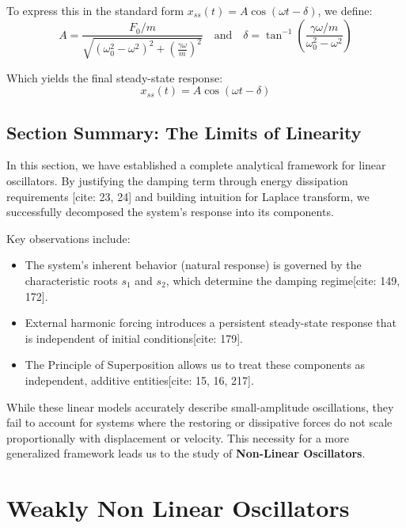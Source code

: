 \documentclass[10pt,twoside]{report}
\begin{document}
To express this in the standard form $x_{ss}(t) = A \cos(\omega t - \delta)$, we define:
\begin{equation}
\label{Amp and phase response for FDO}
    A = \frac{F_0/m}{\sqrt{(\omega_0^2 - \omega^2)^2 + \left(\frac{\gamma \omega}{m}\right)^2}} \quad \text{and} \quad \delta = \tan^{-1}\left( \frac{\gamma \omega/m}{\omega_0^2 - \omega^2} \right)
\end{equation}

Which yields the final steady-state response:
\begin{equation}
    \label{eq:final_steady_state}
    x_{ss}(t) = A \cos(\omega t - \delta)
\end{equation}


\section{Section Summary: The Limits of Linearity}

In this section, we have established a complete analytical framework for linear oscillators. By justifying the damping term through energy dissipation requirements [cite: 23, 24] and building intuition for Laplace transform, we successfully decomposed the system's response into its components. 

Key observations include:
\begin{itemize}
    \item The system's inherent behavior (natural response) is governed by the characteristic roots $s_1$ and $s_2$, which determine the damping regime[cite: 149, 172].
    \item External harmonic forcing introduces a persistent steady-state response that is independent of initial conditions[cite: 179].
    \item The Principle of Superposition allows us to treat these components as independent, additive entities[cite: 15, 16, 217].
\end{itemize}

While these linear models accurately describe small-amplitude oscillations, they fail to account for systems where the restoring or dissipative forces do not scale proportionally with displacement or velocity. This necessity for a more generalized framework leads us to the study of \textbf{Non-Linear Oscillators}.
\newpage






\chapter{Weakly Non Linear Oscillators}
\end{document}

